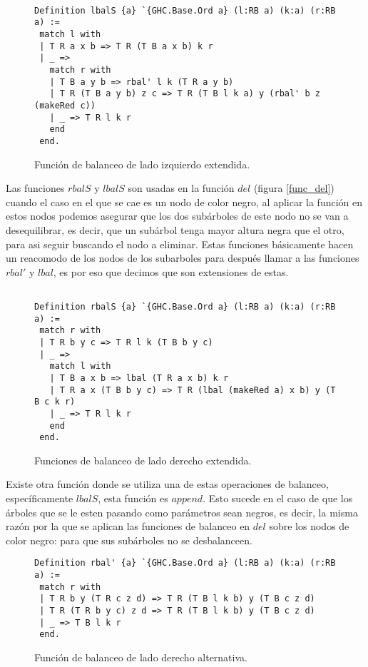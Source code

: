 \begin{figure}
\centering
\captionsetup{justification=centering}
\begin{verbatim}

Definition lbalS {a} `{GHC.Base.Ord a} (l:RB a) (k:a) (r:RB a) :=
 match l with
 | T R a x b => T R (T B a x b) k r
 | _ =>
   match r with
   | T B a y b => rbal' l k (T R a y b)
   | T R (T B a y b) z c => T R (T B l k a) y (rbal' b z (makeRed c))
   | _ => T R l k r
   end
 end.

\end{verbatim}
\caption{Funci\'on de balanceo de lado izquierdo extendida.}
\label{lbalS}
\end{figure}

Las funciones $rbalS$ y $lbalS$ son usadas en la funci\'on $del$ (figura \ref{func_del}) cuando el
caso en el que se cae es un nodo de color negro, al aplicar la funci\'on en estos nodos podemos
asegurar que los dos subárboles de este nodo no se van a desequilibrar, es decir, que un subárbol
tenga mayor altura negra que el otro, para asi seguir buscando el nodo a eliminar. Estas funciones
b\'asicamente hacen un reacomodo de los nodos de los subarboles para despu\'es llamar a las 
funciones $rbal'$ y $lbal$, es por eso que decimos que son extensiones de estas.


\begin{figure}
\centering
\captionsetup{justification=centering}
\begin{verbatim}

Definition rbalS {a} `{GHC.Base.Ord a} (l:RB a) (k:a) (r:RB a) :=
 match r with
 | T R b y c => T R l k (T B b y c)
 | _ =>
   match l with
   | T B a x b => lbal (T R a x b) k r
   | T R a x (T B b y c) => T R (lbal (makeRed a) x b) y (T B c k r)
   | _ => T R l k r
   end
 end.

\end{verbatim}
\caption{Funciones de balanceo de lado derecho extendida.}
\label{rbalS}
\end{figure}

Existe otra función donde se utiliza una de estas operaciones de balanceo, específicamente $lbalS$,
esta funci\'on es $append$. Esto sucede en el caso de que los \'arboles que se le esten pasando como parámetros
sean negros, es decir, la misma razón por la que se aplican las funciones de balanceo en $del$
sobre los nodos de color negro: para que sus subárboles no se desbalanceen.

\begin{figure}
\centering
\captionsetup{justification=centering}
\begin{verbatim}
Definition rbal' {a} `{GHC.Base.Ord a} (l:RB a) (k:a) (r:RB a) :=
 match r with
 | T R b y (T R c z d) => T R (T B l k b) y (T B c z d)
 | T R (T R b y c) z d => T R (T B l k b) y (T B c z d)
 | _ => T B l k r
 end.

\end{verbatim}
\caption{Funci\'on de balanceo de lado derecho alternativa.}
\label{rbal_2}
\end{figure}

